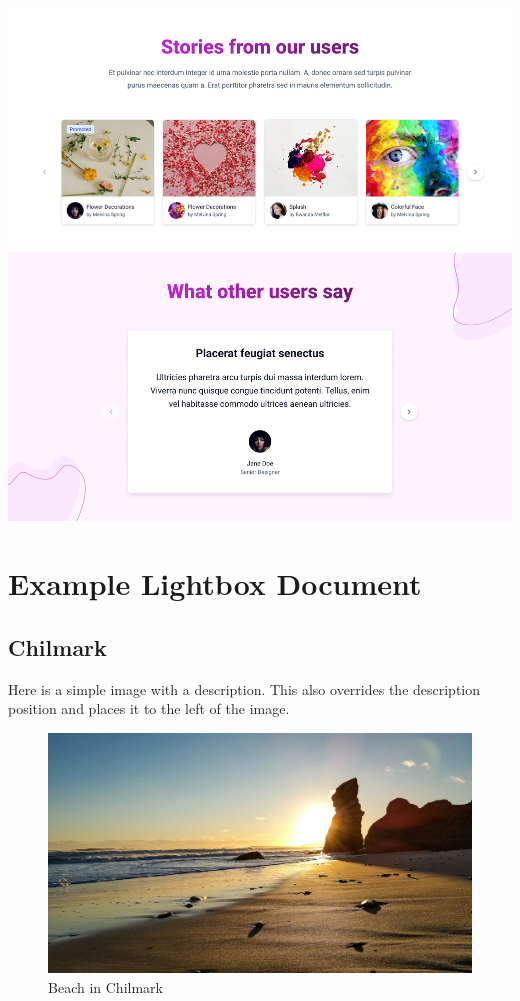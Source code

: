 \documentclass[
  a4paper,
  DIV=11,
  numbers=noendperiod,
  oneside,
  open=any]{scrreprt}
\begin{document}
\includegraphics{images/wniosek3.png}


\chapter{Example Lightbox Document}\label{example-lightbox-document}

\section{Chilmark}\label{chilmark}

Here is a simple image with a description. This also overrides the
description position and places it to the left of the image.

\begin{figure}[H]

{\centering \includegraphics{images/mv-0.jpg}

}

\caption{Beach in Chilmark}

\end{figure}%
\end{document}
